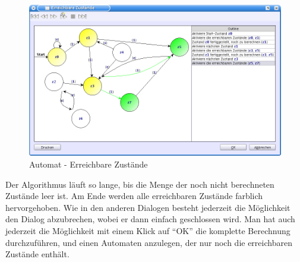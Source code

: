 \begin{figure}[h!]
\begin{center}
\includegraphics[width=12cm]{images/reachable_states.png}
\caption{Automat - Erreichbare Zustände}
\end{center}
\end{figure}

Der Algorithmus läuft so lange, bis die Menge der noch nicht berechneten Zustände
leer ist. Am Ende werden alle erreichbaren Zustände farblich hervorgehoben. Wie
in den anderen Dialogen besteht jederzeit die Möglichkeit den Dialog abzubrechen,
wobei er dann einfach geschlossen wird. Man hat auch jederzeit die Möglichkeit
mit einem Klick auf "`OK"' die komplette Berechnung durchzuführen, und einen
Automaten anzulegen, der nur noch die erreichbaren Zustände enthält.
